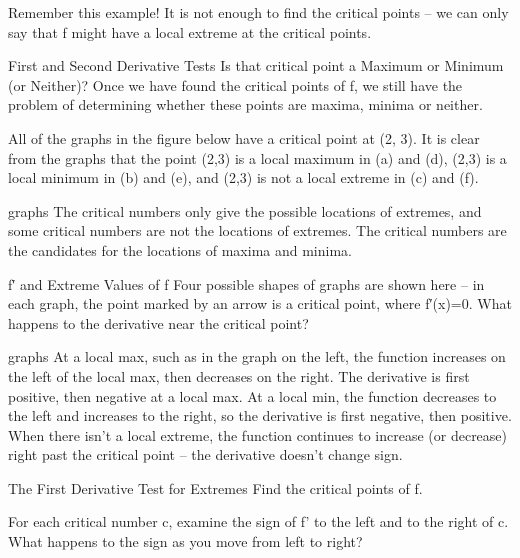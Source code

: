 Remember this example! It is not enough to find the critical points – we can only say that f might have a local extreme at the critical points.

First and Second Derivative Tests
Is that critical point a Maximum or Minimum (or Neither)?
Once we have found the critical points of f, we still have the problem of determining whether these points are maxima, minima or neither.

All of the graphs in the figure below have a critical point at (2, 3). It is clear from the graphs that the point (2,3) is a local maximum in (a) and (d), (2,3) is a local minimum in (b) and (e), and (2,3) is not a local extreme in (c) and (f).

graphs
The critical numbers only give the possible locations of extremes, and some critical numbers are not the locations of extremes. The critical numbers are the candidates for the locations of maxima and minima.

f′ and Extreme Values of f
Four possible shapes of graphs are shown here – in each graph, the point marked by an arrow is a critical point, where f′(x)=0. What happens to the derivative near the critical point?

graphs
At a local max, such as in the graph on the left, the function increases on the left of the local max, then decreases on the right. The derivative is first positive, then negative at a local max. At a local min, the function decreases to the left and increases to the right, so the derivative is first negative, then positive. When there isn’t a local extreme, the function continues to increase (or decrease) right past the critical point – the derivative doesn’t change sign.

The First Derivative Test for Extremes
Find the critical points of f.

For each critical number c, examine the sign of f’ to the left and to the right of c. What happens to the sign as you move from left to right?

